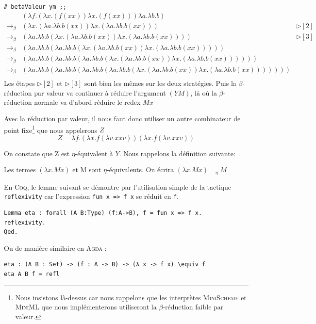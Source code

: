 \texttt{\# betaValeur ym ;;}
$$
\begin{array}{lll}
 & (\lambda f . (\lambda x . (f(xx))\lambda x . (f(xx)))\lambda a . \lambda b . b)  &  \\
\rightarrow _\beta & (\lambda x . (\lambda a . \lambda b . b(xx))\lambda x . (\lambda a . \lambda b . b(xx))) & \triangleright [2]  \\
\rightarrow _\beta & (\lambda a . \lambda b . b(\lambda x . (\lambda a . \lambda b . b(xx))\lambda x . (\lambda a . \lambda b . b(xx)))) & \triangleright [3] \\
\rightarrow _\beta & (\lambda a . \lambda b . b(\lambda a . \lambda b . b(\lambda x . (\lambda a . \lambda b . b(xx))\lambda x . (\lambda a . \lambda b . b(xx)))))  & \\
\rightarrow _\beta & (\lambda a . \lambda b . b(\lambda a . \lambda b . b(\lambda a . \lambda b . b(\lambda x . (\lambda a . \lambda b . b(xx))\lambda x . (\lambda a . \lambda b . b(xx)))))) &  \\
\rightarrow _\beta & (\lambda a . \lambda b . b(\lambda a . \lambda b . b(\lambda a . \lambda b . b(\lambda a . \lambda b . b(\lambda x . (\lambda a . \lambda b . b(xx))\lambda x . (\lambda a . \lambda b . b(xx)))))))  & \\
\end{array}
$$
Les étapes  $\triangleright [2]$ et $\triangleright [3]$ sont bien les mêmes sur les deux stratégies. 
Puis la $\beta$-réduction par valeur va continuer à réduire l'argument
$(YM)$, là où la $\beta$-réduction normale va d'abord réduire le redex $Mx$

Avec la réduction par valeur, il nous faut donc utiliser un autre combinateur de point fixe\footnote{Nous insistons 
là-dessus car nous rappelons que les interprètes \textsc{MiniScheme} et \textsc{MiniML} que nous implémenterons utiliseront la $\beta$-réduction faible par valeur.}
 que nous appelerons $Z$ 
$$Z = \lambda f.(\lambda x.f(\lambda v.xxv))(\lambda x.f(\lambda v.xxv)) $$



On constate que Z est  $\eta$-équivalent à $Y$. Nous rappelons la définition suivante:


\begin{definition}
	
Les termes $(\lambda x.Mx)$ et M sont $\eta$-équivalents. On écrira $(\lambda x.Mx) =_\eta M$


En \textsc{Coq}, le lemme suivant se démontre par l'utilisation simple
de la tactique \texttt{reflexivity} car l'expression \texttt{fun x => f x} se 
réduit en \texttt{f}.
\begin{verbatim}
Lemma eta : forall (A B:Type) (f:A->B), f = fun x => f x.
reflexivity.
Qed.
\end{verbatim}
Ou de manière similaire en \textsc{Agda} :
\begin{verbatim}
eta : (A B : Set) -> (f : A -> B) -> (λ x -> f x) \equiv f
eta A B f = refl
\end{verbatim}
\end{definition}

